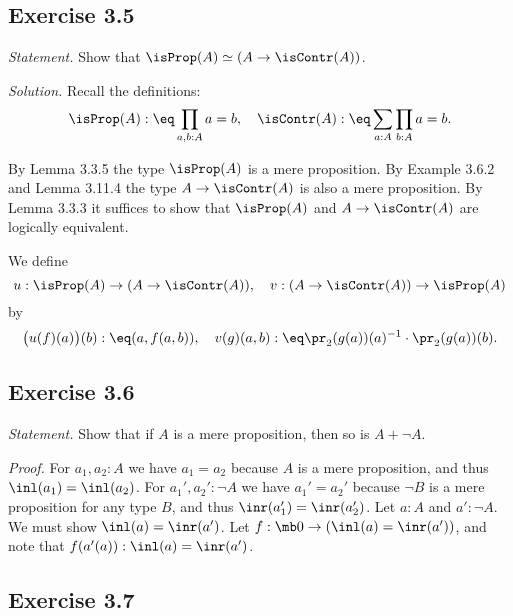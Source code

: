 \documentclass[12pt]{article}
\begin{document}

\subsection{Exercise 3.5}

\emph{Statement.} Show that $\isProp(A)\simeq(A\to\isContr(A))$. 

\nn\emph{Solution.} Recall the definitions: 
$$
\isProp(A):\eq\prod_{a,b:A}a=b,\quad\isContr(A):\eq\sum_{a:A}\prod_{b:A}a=b.
$$

By Lemma 3.3.5 the type $\isProp(A)$ is a mere proposition. By Example 3.6.2 and Lemma 3.11.4 the type $A\to\isContr(A)$ is also a mere proposition. By Lemma 3.3.3 it suffices to show that $\isProp(A)$ and $A\to\isContr(A)$ are logically equivalent. 

We define 
$$
u:\isProp(A)\to(A\to\isContr(A)),\quad v:(A\to\isContr(A))\to\isProp(A)
$$ 
by 
$$
\big(u(f)(a)\big)(b):\eq(a,f(a,b)),\quad v(g)(a,b):\eq\pr_2(g(a))(a)^{-1}\cdot\pr_2(g(a))(b).
$$%






\subsection{Exercise 3.6}\label{e36}

\emph{Statement.} Show that if $A$ is a mere proposition, then so is $A+\neg A$.

\nn\emph{Proof.} For $a_1,a_2:A$ we have $a_1=a_2$ because $A$ is a mere proposition, and thus $\inl(a_1)=\inl(a_2)$. For $a_1',a_2':\neg A$ we have $a_1'=a_2'$ because $\neg B$ is a mere proposition for any type $B$, and thus $\inr(a_1')=\inr(a_2')$. Let $a:A$ and $a':\neg A$. We must show $\inl(a)=\inr(a')$. Let $f:\mb0\to(\inl(a)=\inr(a'))$, and note that $f(a'(a)):\inl(a)=\inr(a')$.


\subsection{Exercise 3.7}
\end{document}
